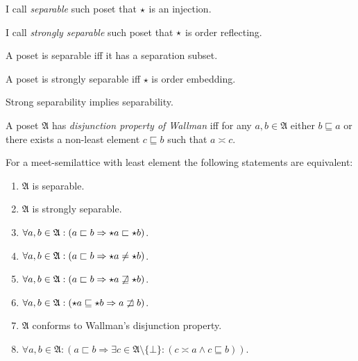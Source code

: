 \begin{defn}
I call \emph{separable} such poset
that $\star$ is an injection.\end{defn}
\begin{defn}
I call \emph{strongly separable} such poset
that $\star$ is order reflecting.\end{defn}
\begin{obvious}
A poset is separable iff it has a separation subset.\end{obvious}
\begin{obvious}
A poset is strongly separable iff $\star$ is order embedding.\end{obvious}
\begin{obvious}
Strong separability implies separability.\end{obvious}
\begin{defn}
A poset $\mathfrak{A}$ has
\emph{disjunction property of Wallman} iff for any $a,b\in\mathfrak{A}$
either $b\sqsubseteq a$ or there exists a non-least element $c\sqsubseteq b$
such that $a\asymp c$.\end{defn}
\begin{thm}
\label{msl-sep-conds}For a meet-semilattice with least element the
following statements are equivalent:
\begin{enumerate}
\item \label{la1}$\mathfrak{A}$ is separable.
\item \label{la2}$\mathfrak{A}$ is strongly separable.
\item \label{la3}$\forall a,b\in\mathfrak{A}:(a\sqsubset b\Rightarrow\star a\sqsubset\star b)$.
\item \label{la4}$\forall a,b\in\mathfrak{A}:(a\sqsubset b\Rightarrow\star a\neq\star b)$.
\item \label{la5}$\forall a,b\in\mathfrak{A}:(a\sqsubset b\Rightarrow\star a\not\sqsupseteq\star b)$.
\item \label{la6}$\forall a,b\in\mathfrak{A}:(\star a\sqsubseteq\star b\Rightarrow a\not\sqsupset b)$.
\item \label{la7}$\mathfrak{A}$ conforms to Wallman's disjunction property.
\item \label{la8}$\forall a,b\in\mathfrak{A}:(a\sqsubset b\Rightarrow\exists c\in\mathfrak{A}\setminus\{\bot\}:(c\asymp a\land c\sqsubseteq b))$.
\end{enumerate}
\end{thm}
